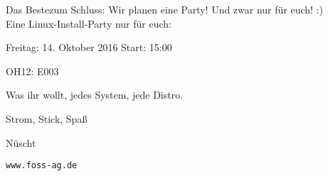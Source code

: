 \begin{frame}{Das Beste}{zum Schluss:}
	Wir planen eine Party! Und zwar nur für euch! :)\\
	Eine Linux-Install-Party nur für euch:\\ 
	\begin{center}
	\begin{description}[<+->]
		\item[Wann?] Freitag: 14. Oktober 2016 Start: 15:00
		\item[Wo?] OH12: E003
		\item[Was?] Was ihr wollt, jedes System, jede Distro.
		\item[Womit?] Strom, Stick, Spaß    
		\item[Koscht?] Nüscht
	\end{description}
	\end{center}
\begin{center}
	{\onslide<5-> \texttt{www.foss-ag.de}}
\end{center}

	\end{frame}
